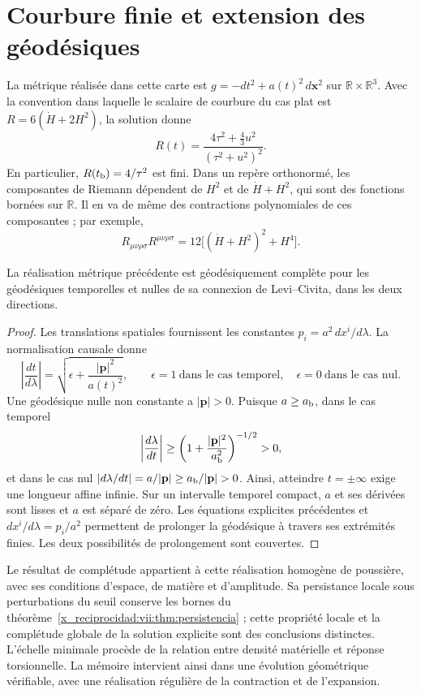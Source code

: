 \section{Courbure finie et extension des géodésiques}
La métrique réalisée dans cette carte est
\(g=-dt^2+a(t)^2\,d\mathbf x^2\) sur
\(\mathbb R\times\mathbb R^3\). Avec la convention dans laquelle
le scalaire de courbure du cas plat est \(R=6(\dot H+2H^2)\), la solution donne
\[
 R(t)=\frac{4\tau^2+\frac43u^2}{(\tau^2+u^2)^2}.
\]
En particulier, \(R(t_{\rm b})=4/\tau^2\) est fini.
Dans un repère orthonormé, les composantes de Riemann dépendent de
\(H^2\) et de \(\dot H+H^2\), qui sont des fonctions bornées sur
\(\mathbb R\). Il en va de même des contractions polynomiales
de ces composantes ; par exemple,
\[
 R_{\mu\nu\rho\sigma}R^{\mu\nu\rho\sigma}
 =12\bigl[(\dot H+H^2)^2+H^4\bigr].
\]

\begin{proposition}
\label{x_reciprocidad:vii:prop:completitud-causal-polvo}
La réalisation métrique précédente est géodésiquement complète
pour les géodésiques temporelles et nulles de sa connexion de
Levi--Civita, dans les deux directions.
\end{proposition}
\begin{proof}
Les translations spatiales fournissent les constantes \(p_i=a^2\,dx^i/d\lambda\). La normalisation causale donne
\[
 \left|\frac{dt}{d\lambda}\right|
 =\sqrt{\epsilon+\frac{|\mathbf p|^2}{a(t)^2}},
 \qquad \epsilon=1\ \text{dans le cas temporel},\quad
 \epsilon=0\ \text{dans le cas nul}.
\]
Une géodésique nulle non constante a \(|\mathbf p|>0\). Puisque \(a\geq a_{\rm b}\), dans le cas temporel
\[
 \left|\frac{d\lambda}{dt}\right|
 \geq\left(1+\frac{|\mathbf p|^2}{a_{\rm b}^2}\right)^{-1/2}>0,
\]
et dans le cas nul
\(\left|d\lambda/dt\right|=a/|\mathbf p|
 \geq a_{\rm b}/|\mathbf p|>0\).
Ainsi, atteindre \(t=\pm\infty\) exige une longueur affine infinie.
Sur un intervalle temporel compact, \(a\) et ses dérivées sont
lisses et \(a\) est séparé de zéro. Les équations explicites
précédentes et \(dx^i/d\lambda=p_i/a^2\) permettent de prolonger la
géodésique à travers ses extrémités finies. Les deux possibilités
de prolongement sont couvertes.
\end{proof}

Le résultat de complétude appartient à cette réalisation homogène de
poussière, avec ses conditions d'espace, de matière et d'amplitude. Sa
persistance locale sous perturbations du seuil conserve les bornes
du théorème~\ref{x_reciprocidad:vii:thm:persistencia} ; cette propriété locale et la
complétude globale de la solution explicite sont des conclusions distinctes.
L'échelle minimale procède de la relation entre densité matérielle et
réponse torsionnelle. La mémoire intervient ainsi dans une évolution
géométrique vérifiable, avec une réalisation régulière de la contraction
et de l'expansion.

